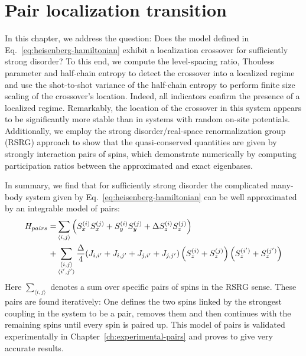 \chapter{Pair localization transition}\label{ch:pair-localization-transition}

In this chapter, we address the question: Does the model defined in Eq.~\ref{eq:heisenberg-hamiltonian} exhibit a localization crossover for sufficiently strong disorder? To this end, we compute the level-spacing ratio, Thouless parameter and half-chain entropy to detect the crossover into a localized regime and use the shot-to-shot variance of the half-chain entropy to perform finite size scaling of the crossover's location. Indeed, all indicators confirm the presence of a localized regime. Remarkably, the location of the crossover in this system appears to be significantly more stable than in systems with random on-site potentials. Additionally, we employ the strong disorder/real-space renormalization group (RSRG) approach to show that the quasi-conserved quantities are given by strongly interaction pairs of spins, which demonstrate numerically by computing participation ratios between the approximated and exact eigenbases.

In summary, we find that for sufficiently strong disorder the complicated many-body system given by Eq.~\ref{eq:heisenberg-hamiltonian} can be well approximated by an integrable model of pairs:
\begin{align}\label{eq:pair-model}
	H_{pairs} =& \sum_{\langle i,j\rangle} \left(S_x^{(i)}S_x^{(j)} + S_y^{(i)}S_y^{(j)} + \Delta S_z^{(i)}S_z^{(j)}\right) \notag\\
	+ &\sum_{\substack{\langle i,j\rangle\\\langle i',j'\rangle}} \frac{\Delta}{4}(J_{i,i'}+J_{i,j'}+J_{j,i'}+J_{j,j'})\left(S_z^{(i)}+S_z^{(j)}\right)\left(S_z^{(i')}+S_z^{(j')}\right)
\end{align}
Here $\sum_{\langle i,j\rangle}$ denotes a sum over specific pairs of spins in the RSRG sense. These pairs are found iteratively: One defines the two spins linked by the strongest coupling in the system to be a pair, removes them and then continues with the remaining spins until every spin is paired up. This model of pairs is validated experimentally in Chapter~\ref{ch:experimental-pairs} and proves to give very accurate results.

\newpage
{}


